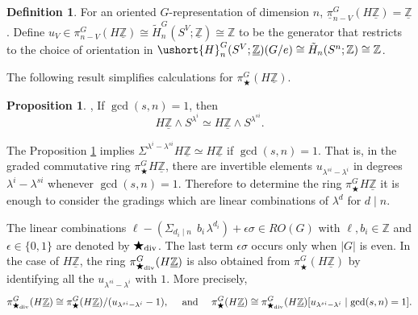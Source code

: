 \documentclass[a4paper,leqno,11pt]{amsart}
\theoremstyle{plain}
\theoremstyle{definition}
\newtheorem{prop}[theorem]{Proposition}
\newtheorem{defn}[theorem]{Definition}
\theoremstyle{remark}
\theoremstyle{definition}
\newcommand{\Z}{{\mathbb{Z}}}
\newcommand{\uH}{\ushort{H}}
\newcommand{\uZ}{\underline{\mathbb{Z}}}
\def\Z{\mathbb{Z}}
\numberwithin{equation}{section}
\newcommand{\smas}{\wedge}
\def\tH{\tilde{H}}
\begin{document}
	\begin{defn}\cite[\S3]{HHR}
		For an oriented $G$-representation of dimension $n$,  $\underline{\pi}^{G}_{n-V}(H\uZ)= \uZ$ \cite[Example 3.10]{HHR}. Define $u_V\in \pi^{G}_{n-V}(H\uZ)\cong \tH^{G}_{n}(S^{V};\uZ)\cong \Z$ to be the generator that restricts to the choice of orientation in $\uH^{G}_{n}(S^V;\uZ)(G/e)\cong \tH_{n}(S^n; \Z)\cong \Z$.
	\end{defn}
	The following result simplifies calculations for $ \pi_\bigstar^G(H\uZ) $. 
	\begin{prop}\cite[Theorem 3.6]{BasuDeyKarmakar-NYJM},  \label{prop:smash-rep}	
		If $ \gcd(s,n)=1 $, then 
		\[
		H\uZ\smas S^{\lambda^i} \simeq H\uZ\smas S^{\lambda^{s i}}.
		\]
	\end{prop}	
	The Proposition \ref{prop:smash-rep} implies  $\Sigma^{\lambda^i-\lambda^{s i}} H\uZ \simeq H\uZ$ if $ \gcd(s,n)=1 $. That is, in the graded commutative ring $\pi^G_\bigstar H\uZ$, there are invertible elements  $ u_{\lambda^{si}-\lambda^i}$ in degrees $\lambda^{i} - \lambda^{si}$ whenever $\gcd (s,n)=1$. Therefore to determine the ring $\pi^G_\bigstar H\uZ$  it is enough to consider the gradings which are linear combinations of $\lambda^d$ for $d\mid n$.\par
	 The linear combinations $ \ell -(\Sigma_{d_i\mid n} ~~b_i\mspace{2mu} \lambda^{d_i})  + \epsilon \sigma\in RO(G)$  with $\ell, b_i\in \Z $ and $\epsilon \in \{ 0, 1\}$  are denoted by $ \bigstar_{\textup{div}} $. The last term $\epsilon \sigma$ occurs only when $|G|$ is even. In the case of $ H\uZ $, the ring $ \pi^G_{\bigstar_{\textup{div}}}(H\uZ) $ is also obtained from $ \pi^G_{\bigstar}(H\uZ) $ by identifying all the
	 $  u_{\lambda^{si}-\lambda^i} $ with $ 1 $. More precisely,
	\[
	\pi^G_{\bigstar_{\textup{div}}}(H\uZ) \cong\pi^G_{\bigstar}(H\uZ)/(u_{\lambda^{si}-\lambda^i}-1) ,\quad \textup{~and~} \quad  \pi^G_{\bigstar}(H\uZ)\cong \pi^G_{\bigstar_{\textup{div}}}(H\uZ)[u_{\lambda^{si}-\lambda^i}\mid \gcd(s,n)=1].
	\]
	
\end{document}
